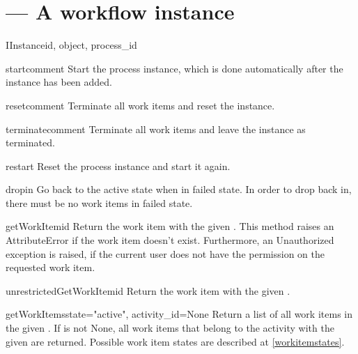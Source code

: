   \section{ --- A workflow instance}

    \begin{classdesc}{IInstance}{id, object, process_id}
     
      \begin{funcdesc}{start}{comment}
        Start the process instance, which is done automatically after 
        the instance has been added.
      \end{funcdesc}

      \begin{funcdesc}{reset}{comment}
        Terminate all work items and reset the instance. 
      \end{funcdesc}

      \begin{funcdesc}{terminate}{comment}
        Terminate all work items and leave the instance as terminated.
      \end{funcdesc}

      \begin{funcdesc}{restart}
        Reset the process instance and start it again.
      \end{funcdesc}

      \begin{funcdesc}{dropin}
        Go back to the active state when in failed state. In order to 
        drop back in, there must be no work items in failed state.
      \end{funcdesc}

      \begin{funcdesc}{getWorkItem}{id}
        Return the work item with the given . This method 
        raises an AttributeError if the work item doesn't exist. 
        Furthermore, an Unauthorized exception is raised, if the 
        current user does not have the  
        permission on the requested work item.
      \end{funcdesc}

      \begin{funcdesc}{unrestrictedGetWorkItem}{id}
        Return the work item with the given .
      \end{funcdesc}

      \begin{funcdesc}{getWorkItems}{state="active", activity_id=None}
        Return a list of all work items in the given . If 
         is not None, all work items that belong to 
        the activity with the given  are returned. Possible 
          work item states are described at \ref{workitemstates}.
      \end{funcdesc}


\end{classdesc}
